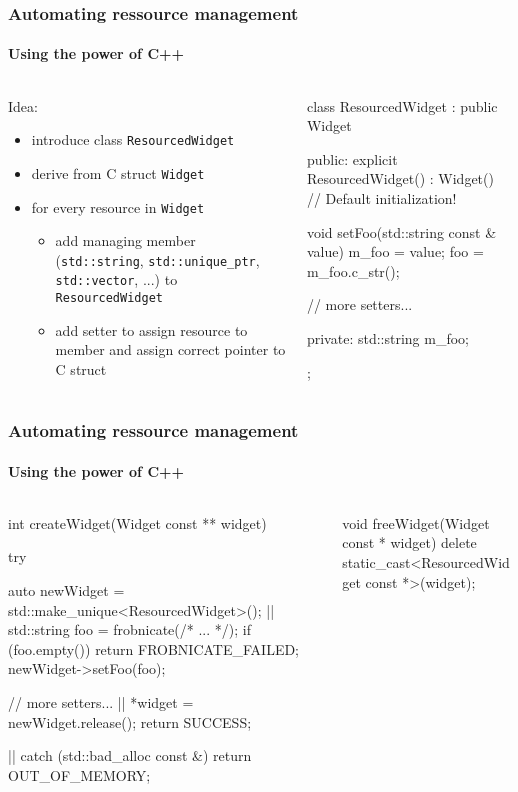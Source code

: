 \documentclass{beamer}
\def\code#1{\texttt{#1}}
\begin{document}
\begin{frame}[fragile]
\frametitle{Automating ressource management}
\framesubtitle{Using the power of C++}
\begin{columns}
\begin{column}{0.45\textwidth}
Idea:
\begin{itemize}
\item introduce class \code{ResourcedWidget}
\pause
\item derive from C struct \code{Widget}
\pause
\item for every resource in \code{Widget}
\pause
\begin{itemize}
	\item add managing member (\code{std::string}, \code{std::unique\_ptr}, \code{std::vector}, ...) to \code{ResourcedWidget}
	\pause
	\item add setter to assign resource to member and assign correct pointer to C struct
\end{itemize}
\end{itemize}
\end{column}
\pause
\begin{column}{0.45\textwidth}
\begin{TinyC++}
class ResourcedWidget : public Widget
{
public:
	explicit ResourcedWidget()
        : Widget()	// Default initialization!
	{}

	void setFoo(std::string const & value)
	{
		m_foo = value;
		foo = m_foo.c_str();
	}

	// more setters...
	
private:
	std::string m_foo;
};
\end{TinyC++}
\end{column}
\end{columns}
\end{frame}


\begin{frame}[fragile]
\frametitle{Automating ressource management}
\framesubtitle{Using the power of C++}
\begin{columns}
\begin{column}{0.45\textwidth}
\begin{TinyC++}
int createWidget(Widget const ** widget)
{
	try
	{
		auto newWidget = std::make_unique<ResourcedWidget>();
	    |\pause|
		std::string	foo = frobnicate(/* ... */);
		if (foo.empty())
		{
			return FROBNICATE_FAILED;
		}
		newWidget->setFoo(foo);

		// more setters...
    	|\pause|
		*widget = newWidget.release();
		return SUCCESS;
	}|\pause|
	catch (std::bad_alloc const &)
	{
		return OUT_OF_MEMORY;
	}
}
\end{TinyC++}
\end{column}
\pause
\begin{column}{0.45\textwidth}
\begin{TinyC++}
void freeWidget(Widget const * widget)
{
	delete static_cast<ResourcedWidget const *>(widget);
}
\end{TinyC++}
\end{column}
\end{columns}
\end{frame}
\end{document}
